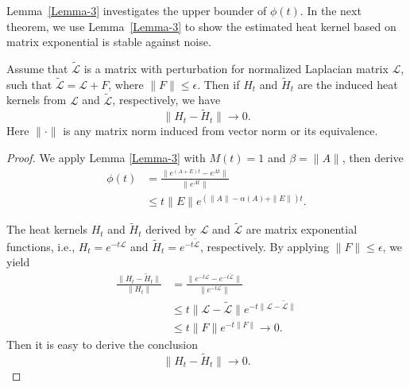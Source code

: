 \documentclass[10pt,journal,compsoc]{IEEEtran}
\begin{document}
Lemma~\ref{Lemma-3} investigates the upper bounder of $\phi(t)$. In the next theorem, we use Lemma~\ref{Lemma-3} to show the estimated heat kernel based on matrix exponential is stable against noise.


\begin{theorem}\label{Theorem-3}
  Assume that $\mathcal{\tilde{L}}$ is a matrix with perturbation for normalized Laplacian matrix $\mathcal{L}$, such that $\mathcal{\tilde{L}} = \mathcal{L} + F$, where $\|F\| \leq \epsilon$. Then if $H_{t}$ and $\tilde{H}_{t}$ are the induced heat kernels from $\mathcal{L}$ and $\mathcal{\tilde{L}}$, respectively, we have
  \begin{equation}
    \|H_{t} - \tilde{H}_{t}\| \rightarrow 0.
  \end{equation}
  Here $\| \cdot\|$ is any matrix norm induced from vector norm or its equivalence.
\end{theorem}


\begin{proof}
    We apply Lemma \ref{Lemma-3} with $M(t) = 1$ and $\beta = \|A\|$, then derive
    \begin{equation}
    \begin{aligned}
    \phi(t) & = \frac{\|e^{(A+E)t} - e^{At}\|}{\|e^{At}\|} \\
            & \leq t \|E\| e^{(\|A\| - \alpha(A) + \|E\|)t}.
    \end{aligned}
    \end{equation}


    The heat kernels $H_{t}$ and $\tilde{H}_{t}$ derived by $\mathcal{L}$ and $\mathcal{\tilde{L}}$ are matrix exponential functions, i.e., $H_{t} = e^{-t \mathcal{L}}$ and $\tilde{H}_{t} = e^{-t \mathcal{\tilde{L}}}$, respectively. By applying $\|F\| \leq \epsilon$, we yield
    \begin{equation}
    \begin{aligned}
    \frac{\|H_{t} -  \tilde{H}_{t}\|}{\|H_{t}\|} & = \frac{\|e^{-t \mathcal{L}} -  e^{-t \mathcal{\tilde{L}}}\|}{\|e^{-t \mathcal{L}}\|} \\
    & \leq t \|\mathcal{L} -  \mathcal{\tilde{L}}\| e^{-t \|\mathcal{L} -  \mathcal{\tilde{L}}\|} \\
    & \leq t \|F\| e^{-t \|F\|} \rightarrow 0.
    \end{aligned}
    \end{equation}
    Then it is easy to derive the conclusion
    \begin{equation}
    \|H_{t} - \tilde{H}_{t}\| \rightarrow 0.
    \end{equation}
\end{proof}
\end{document}

